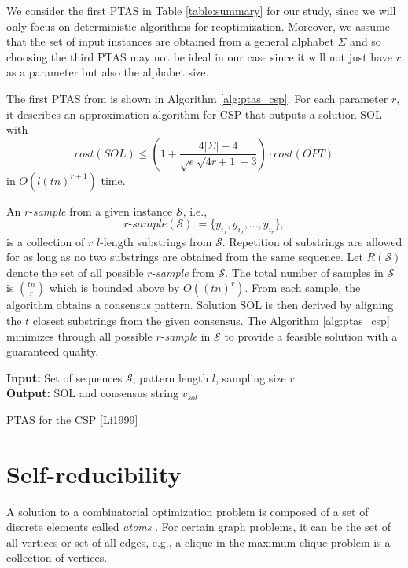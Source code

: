 \documentclass[journal]{acm_proc_article-sp}
\def\S{\ensuremath{\mathcal{S}}\xspace}
\begin{document}
We consider the first PTAS in Table \ref{table:summary} for our study, since we will  only focus on deterministic algorithms for reoptimization. Moreover, we assume that the set of input instances are obtained from  a general alphabet $\Sigma$ and so choosing the third PTAS may not be ideal in our case since it will not just have $r$ as a parameter but also the alphabet size.

The first PTAS from \cite{Li1999} is shown in Algorithm \ref{alg:ptas_csp}. For each parameter $r$, it describes an approximation algorithm for CSP that outputs a solution SOL with  $$cost(SOL) \leq \left( 1 + \frac{4|\Sigma| - 4}{\sqrt{e}\sqrt{4r+1}-3} \right) \cdot cost(OPT)$$  in $O(l(tn)^{r+1})$ time.

An $r$-\textit{sample} from a given instance $\S$, i.e., 
$$r\text{-}sample(\S)\ = \{y_{i_1},  y_{i_2}, \ldots, y_{i_r}\},$$ is a collection of $r$ $l$-length substrings  from $\mathcal{S}$.  Repetition of substrings are  allowed for as long as no two substrings are obtained from the same sequence.  Let $R(\mathcal{S})$ denote the set of all possible  $r$-\textit{sample} from $\mathcal{S}$.  The total number of 
samples in $\mathcal{S}$ is  ${tn \choose r}$ which is bounded above by $O((tn)^r)$.  From each sample, the algorithm obtains a consensus pattern. Solution SOL is then derived by aligning the $t$ closest substrings from the given consensus. The Algorithm \ref{alg:ptas_csp} minimizes  through all possible $r$-\textit{sample} in \S  to provide a feasible solution with a guaranteed quality.

\begin{algorithm}
\textbf{Input:} {Set of sequences $\mathcal{S}$, {pattern length} $l$, {sampling size $r$}} \\
\textbf{Output:} {SOL and consensus string $v_{sol}$} 
\begin{algorithmic}[1]

\EndFor
{}
\EndFor
\end{algorithmic}
\caption{PTAS for the CSP [Li1999]}
\label{alg:ptas_csp}
\end{algorithm}

\section{Self-reducibility}  \label{sec:selfreducibility}
A solution to a combinatorial optimization problem is composed of a set of discrete elements called \textit{atoms} \cite{Zych2012}. For certain graph problems, it can be the set of all vertices or set of all edges, e.g., a clique in the maximum clique problem is a collection of vertices.
\end{document}
